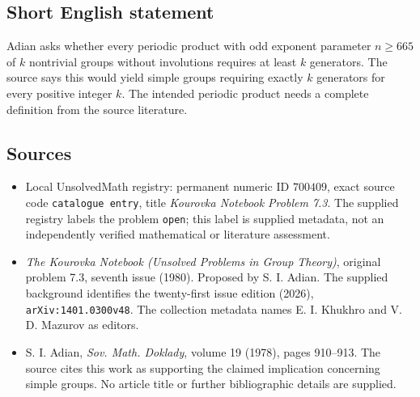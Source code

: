 \documentclass[11pt]{article}
\begin{document}
\subsection{Short English statement}
Adian asks whether every periodic product with odd exponent parameter \(n\geq665\) of \(k\) nontrivial groups without involutions requires at least \(k\) generators. The source says this would yield simple groups requiring exactly \(k\) generators for every positive integer \(k\). The intended periodic product needs a complete definition from the source literature.
\subsection{Sources}
\begin{itemize}
\item Local UnsolvedMath registry: permanent numeric ID \(700409\), exact source code \texttt{catalogue entry}, title \emph{Kourovka Notebook Problem 7.3}. The supplied registry labels the problem \texttt{open}; this label is supplied metadata, not an independently verified mathematical or literature assessment.
\item \emph{The Kourovka Notebook (Unsolved Problems in Group Theory)}, original problem 7.3, seventh issue (1980). Proposed by S. I. Adian. The supplied background identifies the twenty-first issue edition (2026), \texttt{arXiv:1401.0300v48}. The collection metadata names E. I. Khukhro and V. D. Mazurov as editors.
\item S. I. Adian, \emph{Sov. Math. Doklady}, volume 19 (1978), pages 910--913. The source cites this work as supporting the claimed implication concerning simple groups. No article title or further bibliographic details are supplied.
\end{itemize}
\end{document}

